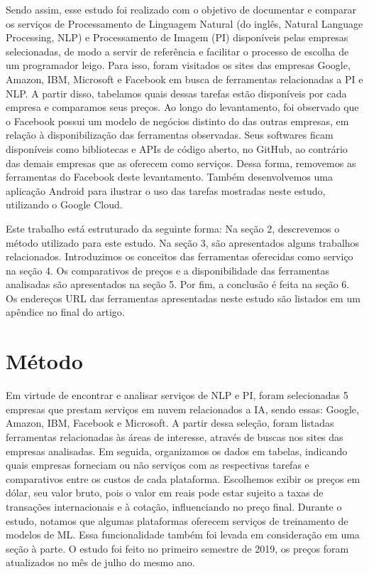 \documentclass{article}
\begin{document}
Sendo assim, esse estudo foi realizado com o objetivo de documentar e comparar os serviços de Processamento de Linguagem Natural (do inglês, Natural Language Processing, NLP) e Processamento de Imagem (PI) disponíveis pelas empresas selecionadas, de modo a servir de referência e facilitar o processo de escolha de um programador leigo. Para isso, foram visitados os sites das empresas Google, Amazon, IBM, Microsoft e Facebook em busca de ferramentas relacionadas a PI e NLP. A partir disso, tabelamos quais dessas tarefas estão disponíveis por cada empresa e comparamos seus preços. Ao longo do levantamento, foi observado que o Facebook possui um modelo de negócios distinto do das outras empresas, em relação à disponibilização das ferramentas observadas. Seus softwares ficam disponíveis como bibliotecas e APIs de código aberto, no GitHub, ao contrário das demais empresas que as oferecem como serviços. Dessa forma, removemos as ferramentas do Facebook deste levantamento. Também desenvolvemos uma aplicação Android para ilustrar o uso das tarefas mostradas neste estudo, utilizando o Google Cloud.

Este trabalho está estruturado da seguinte forma: Na seção 2, descrevemos o método utilizado para este estudo. Na seção 3, são apresentados alguns trabalhos relacionados. Introduzimos os conceitos das ferramentas oferecidas como serviço na seção 4. Os comparativos de preços e a disponibilidade das ferramentas analisadas são apresentados na seção 5. Por fim, a conclusão é feita na seção 6. Os endereços URL das ferramentas apresentadas neste estudo são listados em um apêndice no final do artigo.

\section{Método}
Em virtude de encontrar e analisar serviços de NLP e PI, foram selecionadas 5 empresas que prestam serviços em nuvem relacionados a IA, sendo essas: Google, Amazon, IBM, Facebook e Microsoft. A partir dessa seleção, foram listadas ferramentas relacionadas às áreas de interesse, através de buscas nos sites das empresas analisadas. Em seguida, organizamos os dados em tabelas, indicando quais empresas forneciam ou não serviços com as respectivas tarefas e comparativos entre os custos de cada plataforma. Escolhemos exibir os preços em dólar, seu valor bruto, pois o valor em reais pode estar sujeito a taxas de transações internacionais e à cotação, influenciando no preço final. Durante o estudo, notamos que algumas plataformas oferecem serviços de treinamento de modelos de ML. Essa funcionalidade também foi levada em consideração em uma seção à parte. O estudo foi feito no primeiro semestre de 2019, os preços foram atualizados no mês de julho do mesmo ano.
\end{document}
